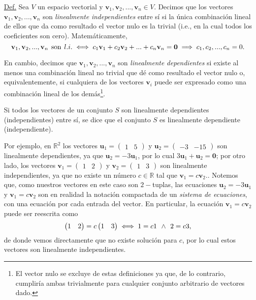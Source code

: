 \documentclass[apuntes]{subfiles}
\begin{document}
\begin{tcolorbox}

    \underline{Def.} Sea $V$ un espacio vectorial y $\mathbf{v}_1,\mathbf{v}_2,...,\mathbf{v}_n\in V$. Decimos que los vectores $\mathbf{v}_1,\mathbf{v}_2, ...,\mathbf{v}_n$ son \emph{linealmente independientes} entre sí si la única combinación lineal de ellos que da como resultado el vector nulo es la trivial (i.e., en la cual todos los coeficientes son cero). Matemáticamente, $$\mathbf{v}_1,\mathbf{v}_2, ..., \mathbf{v}_n \hspace{1.5mm} \text{son} \hspace{1.5mm} l.i. \iff c_1\mathbf{v}_1+c_2\mathbf{v}_2+...+c_n\mathbf{v}_n=\mathbf{0}\implies c_1,c_2, ...,c_n=0.$$

    En cambio, decimos que $\mathbf{v}_1,\mathbf{v}_2, ..., \mathbf{v}_n$ son \emph{linealmente dependientes} si existe al menos una combinación lineal no trivial que dé como resultado el vector nulo o, equivalentemente, si cualquiera de los vectores $\mathbf{v}_i$ puede ser expresado como una combinación lineal de los demás\footnote{El vector nulo se excluye de estas definiciones ya que, de lo contrario, cumpliría ambas trivialmente para cualquier conjunto arbitrario de vectores dado.}.

    Si todos los vectores de un conjunto $S$ son linealmente dependientes (independientes) entre sí, se dice que el conjunto $S$ es linealmente dependiente (independiente).

\end{tcolorbox}

Por ejemplo, en $\mathbb{R}^2$ los vectores $\mathbf{u}_1=\begin{pmatrix} 1 & 5 \end{pmatrix}$ y $\mathbf{u}_2=\begin{pmatrix} -3 & -15 \end{pmatrix}$ son linealmente dependientes, ya que $\mathbf{u}_2=-3\mathbf{u}_1$, por lo cual $3\mathbf{u}_1+\mathbf{u}_2=\mathbf{0}$; por otro lado, los vectores $\mathbf{v}_1=\begin{pmatrix} 1 & 2 \end{pmatrix}$ y $\mathbf{v}_2=\begin{pmatrix} 1 & 3 \end{pmatrix}$ son linealmente independientes, ya que no existe un número $c\in\mathbb{R}$ tal que $\mathbf{v}_1=c\mathbf{v}_2.$. Notemos que, como nuestros vectores en este caso son $2-$tuplas, las ecuaciones $\mathbf{u}_2=-3\mathbf{u}_1$ y $\mathbf{v}_1=c\mathbf{v}_2$ son en realidad la notación compactada de un \emph{sistema de ecuaciones}, con una ecuación por cada entrada del vector. En particular, la ecuación $\mathbf{v}_1=c\mathbf{v}_2$ puede ser reescrita como $$\begin{pmatrix} 1 & 2 \end{pmatrix}=c\begin{pmatrix} 1 & 3 \end{pmatrix}\iff 1=c1 \hspace{1.5mm} \land\hspace{1.5mm} 2=c3,$$ de donde vemos directamente que no existe solución para $c$, por lo cual estos vectores son linealmente independientes.
\end{document}
